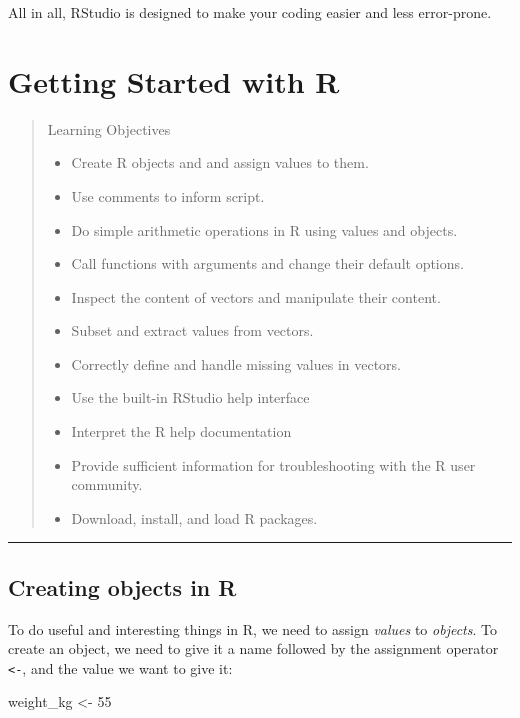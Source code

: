 \documentclass[]{book}
\newenvironment{Shaded}{\begin{snugshade}}{\end{snugshade}}
\newcommand{\DecValTok}[1]{\textcolor[rgb]{0.00,0.00,0.81}{#1}}
\newcommand{\StringTok}[1]{\textcolor[rgb]{0.31,0.60,0.02}{#1}}
\newcommand{\NormalTok}[1]{#1}
\providecommand{\tightlist}{%
  \setlength{\itemsep}{0pt}\setlength{\parskip}{0pt}}
\begin{document}
All in all, RStudio is designed to make your coding easier and less
error-prone.

\chapter{Getting Started with R}\label{gettingstarted}

\begin{quote}
Learning Objectives

\begin{itemize}
\tightlist
\item
  Create R objects and and assign values to them.
\item
  Use comments to inform script.
\item
  Do simple arithmetic operations in R using values and objects.
\item
  Call functions with arguments and change their default options.
\item
  Inspect the content of vectors and manipulate their content.
\item
  Subset and extract values from vectors.
\item
  Correctly define and handle missing values in vectors.
\item
  Use the built-in RStudio help interface
\item
  Interpret the R help documentation
\item
  Provide sufficient information for troubleshooting with the R user
  community.
\item
  Download, install, and load R packages.
\end{itemize}
\end{quote}

\begin{center}\rule{0.5\linewidth}{\linethickness}\end{center}

\section{Creating objects in R}\label{creating-objects-in-r}

To do useful and interesting things in R, we need to assign
\emph{values} to \emph{objects}. To create an object, we need to give it
a name followed by the assignment operator \texttt{\textless{}-}, and
the value we want to give it:

\begin{Shaded}
\begin{Highlighting}[]
\NormalTok{weight_kg <-}\StringTok{ }\DecValTok{55}
\end{Highlighting}
\end{Shaded}
\end{document}
